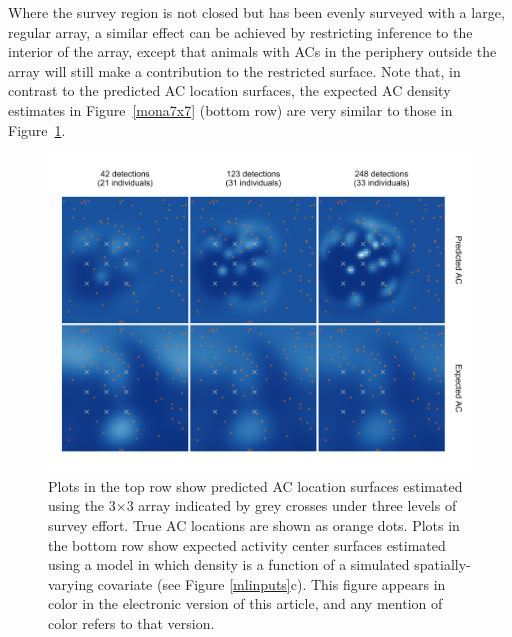 \documentclass[useAMS,usenatbib,referee]{biom}
\begin{document}
Where the survey region is not closed but has been evenly surveyed with a large, regular array, a similar effect can be achieved by restricting inference to the interior of the array, except that animals with ACs in the periphery outside the array will still make a contribution to the restricted surface. Note that, in contrast to the predicted AC location surfaces, the expected AC density estimates in Figure~\ref{mona7x7} (bottom row) are very similar to those in Figure~\ref{mona3x3}. 

\begin{figure}[htbp]
\centering
\includegraphics[width=1\textwidth]{mona_3x3.png}
\caption{Plots in the top row show predicted AC location surfaces estimated using the 3$\times$3 array indicated by grey crosses under three levels of survey effort. True AC locations are shown as orange dots. Plots in the bottom row show expected activity center surfaces estimated using a model in which density is a function of a simulated spatially-varying covariate (see Figure \ref{mlinputs}c). This figure appears in color in the electronic version of this article, and any mention of color refers to that version.}
\label{mona3x3}
\end{figure}
\end{document}
